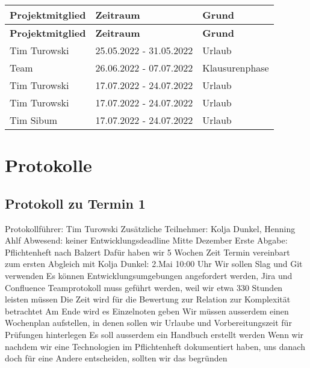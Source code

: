 \begin{flushleft}
		\begin{longtable}{p{4cm}p{6cm}p{8cm}}
            \toprule
            \textbf{Projektmitglied} & \textbf{Zeitraum} & \textbf{Grund} \\
            \midrule\endfirsthead
            \toprule
            \textbf{Projektmitglied} & \textbf{Zeitraum} & \textbf{Grund} \\
            \midrule\endhead
            	Tim Turowski & 25.05.2022 - 31.05.2022 & Urlaub \\ \midrule
				Team & 26.06.2022 - 07.07.2022 & Klausurenphase \\ \midrule
				Tim Turowski & 17.07.2022 - 24.07.2022 & Urlaub \\  \midrule
				Tim Turowski & 17.07.2022 - 24.07.2022 & Urlaub \\ \midrule
				Tim Sibum & 17.07.2022 - 24.07.2022 & Urlaub \\ 
            \bottomrule
    \end{longtable}
\end{flushleft}

\section{Protokolle}
\subsection{Protokoll zu Termin 1}
Protokollführer: Tim Turowski \newline
Zusätzliche Teilnehmer: Kolja Dunkel, Henning Ahlf \newline
Abwesend: keiner \newline \newline
Entwicklungsdeadline Mitte Dezember \newline
Erste Abgabe: Pflichtenheft nach Balzert \newline
Dafür haben wir 5 Wochen Zeit \newline
Termin vereinbart zum ersten Abgleich mit Kolja Dunkel: 2.Mai 10:00 Uhr \newline
Wir sollen Slag und Git verwenden \newline
Es können Entwicklungsumgebungen angefordert werden, Jira und Confluence \newline
Teamprotokoll muss geführt werden, weil wir etwa 330 Stunden leisten müssen \newline
Die Zeit wird für die Bewertung zur Relation zur Komplexität betrachtet \newline
Am Ende wird es Einzelnoten geben \newline
Wir müssen ausserdem einen Wochenplan aufstellen, in denen sollen wir Urlaube und Vorbereitungszeit für Prüfungen hinterlegen \newline
Es soll ausserdem ein Handbuch erstellt werden \newline
Wenn wir nachdem wir eine Technologien im Pflichtenheft dokumentiert haben, uns danach doch für eine Andere entscheiden, sollten wir das begründen 

